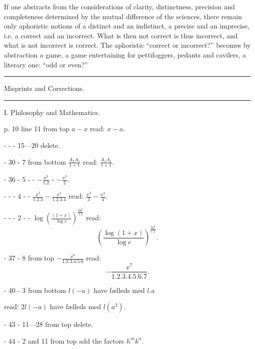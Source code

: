 \documentclass[12pt,a4paper,openany]{book}
\newcommand{\opage}[1]{\marginnote{\footnotesize\textit{[#1]}}}
\begin{document}
If one abstracts from the considerations of clarity, distinctness, precision and completeness determined by the mutual
difference of the sciences, there remain only aphoristic notions of a distinct and an indistinct, a precise and
an imprecise, i.e. a correct and an incorrect.
What is then not correct is thus incorrect, and what is
not incorrect is correct. The aphoristic ``correct or
incorrect?'' becomes by abstraction a game, a game entertaining for pettifoggers, pedants and cavilers, a
literary one: ``odd or even?'' 

\begin{center}\rule{3em}{0.4pt}\end{center}

\opage{53}\setcounter{footnote}{0}%

\begin{center}Misprints and Corrections.\end{center}

\begin{center}\rule{3em}{0.4pt}\end{center}

\begin{center}I. Philosophy and Mathematics.\end{center}

\noindent p. 10 line 11 from top $a - x$ read: $x - a$.

\noindent - - - 15---20 delete.

\noindent - 30 - 7 from bottom $\frac{A_{2}A_{1}}{1 + 1}$ read: $\frac{A_{1}A_{1}}{1 + 1}$.

\noindent - 36 - 5 - - $-\frac{x^{2}}{1.2}$ - $-\frac{x^{2}}{2}$.

\noindent - - - 4 - - $\frac{x^{3}}{1.2.3} - \frac{x^{4}}{1.2.3.4}$ read: $\frac{x^{3}}{3} - \frac{x^{4}}{4}$.

\noindent - - - 2 - - $\log \left( \frac{(1 + x)}{\log e} \right)^{\frac{2y^{2}}{1.2}}$ read:
\[ \left( \frac{\log (1 + x)}{\log e} \right)^{\frac{2y^{2}}{1.2}}. \]

\noindent - 37 - 8 from top $-\frac{x^{6}}{1.2.3.4.5.6}$ read:
\[ -\frac{x^{7}}{1.2.3.4.5.6.7}. \]

\noindent - 40 - 3 from bottom $l (-a)$ have fælleds med $l. a$

\noindent read: $2 l (-a)$ have fælleds med $l (a^{2})$.

\noindent - 43 - 11---28 from top delete.

\noindent - 44 - 2 and 11 from top add the factors $h^{m} k^{n}$.
\end{document}
